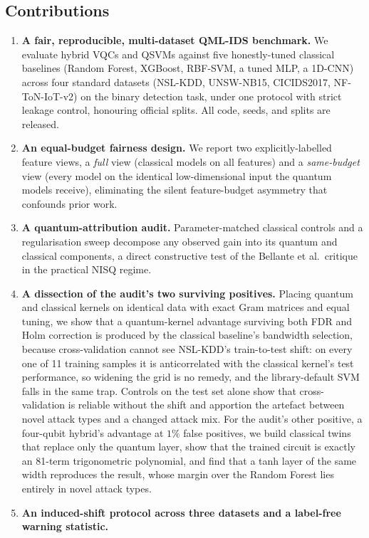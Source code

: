 \documentclass[preprint,11pt]{elsarticle}
\begin{document}
\subsection{Contributions}
\begin{enumerate}\itemsep2pt
\item \textbf{A fair, reproducible, multi-dataset QML-IDS benchmark.} We evaluate hybrid VQCs
and QSVMs against five honestly-tuned classical baselines (Random Forest, XGBoost, RBF-SVM, a
tuned MLP, a 1D-CNN) across four standard datasets (NSL-KDD, UNSW-NB15, CICIDS2017,
NF-ToN-IoT-v2) on the binary detection task, under one protocol with strict leakage control,
honouring official splits. All code, seeds, and splits are released.
\item \textbf{An equal-budget fairness design.} We report two explicitly-labelled feature
views, a \emph{full} view (classical models on all features) and a \emph{same-budget} view
(every model on the identical low-dimensional input the quantum models receive), eliminating
the silent feature-budget asymmetry that confounds prior work.
\item \textbf{A quantum-attribution audit.} Parameter-matched classical controls and a
regularisation sweep decompose any observed gain into its quantum and classical components, a
direct constructive test of the Bellante et al.\ critique in the practical NISQ regime.
\item \textbf{A dissection of the audit's two surviving positives.} Placing quantum and classical kernels
on identical data with exact Gram matrices and equal tuning, we show that a quantum-kernel advantage
surviving both FDR and Holm correction is produced by the classical baseline's bandwidth selection, because cross-validation cannot see NSL-KDD's train-to-test shift: on every one of
11 training samples it is anticorrelated with the classical kernel's test performance, so widening
the grid is no remedy, and the library-default SVM falls in the same trap. Controls on the test set
alone show that cross-validation is reliable without the shift and apportion the artefact between novel
attack types and a changed attack mix. For the audit's other positive, a four-qubit hybrid's advantage at
$1\%$ false positives, we build classical twins that replace only the quantum layer, show that the
trained circuit is exactly an 81-term trigonometric polynomial, and find that a tanh layer of the same
width reproduces the result, whose margin over the Random Forest lies entirely in novel attack types.
\item \textbf{An induced-shift protocol across three datasets and a label-free warning statistic.}

\end{enumerate}
\end{document}
